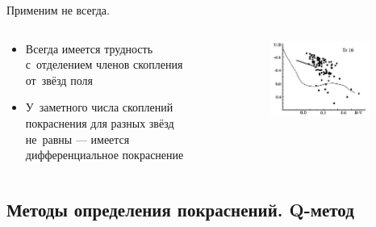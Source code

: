 \documentclass{beamer}
\begin{document}
    \begin{frame}
        Применим не всегда.
        \begin{columns}
            \begin{column}{0.5\textwidth}
                    \begin{itemize}
                        \item Всегда имеется трудность с~отделением членов скопления от~звёзд поля
                        \item У~заметного числа скоплений покраснения для разных звёзд не~равны --- имеется дифференциальное покраснение
                    \end{itemize}
            \end{column}
            \begin{column}{0.5\textwidth}
                \begin{figure}
                \centering
                    \includegraphics[width=0.9\textwidth]{pictures/Tr2Col.jpg}
                \end{figure}
            \end{column}
        \end{columns}
    \end{frame}
    \subsection{Методы определения покраснений. Q-метод}
    \begin{frame}

    \end{frame}
    \begin{frame}

    \end{frame}
\end{document}
